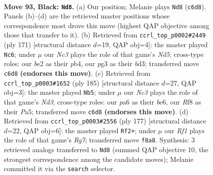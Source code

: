 \documentclass[11pt]{article}
\begin{document}
\clearpage

\begin{figure}[p]\centering
\begin{subfigure}{0.46\textwidth}\centering
\resizebox{\linewidth}{!}{%
\newchessgame
\chessboard[
  setfen={5r2/3k4/P1n5/8/8/4K1PP/2P1B3/1R6 b - - 20 93},
  showmover=false,
  pgfstyle=straightmove, color=movearrow, markmove={c6-d8}
]}
\caption{}
\end{subfigure}\hfill
\begin{subfigure}{0.46\textwidth}\centering
\resizebox{\linewidth}{!}{%
\newchessgame
\chessboard[
  setfen={8/8/8/3k4/PP1n4/3B3R/1K6/6r1 b - - 0 86},
  showmover=false,
  pgfstyle=straightmove, color=movearrow, markmove={d4-c6}
]}
\caption{}
\end{subfigure}
\\[4pt]
\begin{subfigure}{0.46\textwidth}\centering
\resizebox{\linewidth}{!}{%
\newchessgame
\chessboard[
  setfen={8/8/3nB3/p1k5/8/2PK4/P7/8 b - - 60 93},
  showmover=false,
  pgfstyle=straightmove, color=movearrow, markmove={d6-b5}
]}
\caption{}
\end{subfigure}\hfill
\begin{subfigure}{0.46\textwidth}\centering
\resizebox{\linewidth}{!}{%
\newchessgame
\chessboard[
  setfen={8/8/8/2n2B2/3k1K2/7P/6r1/4R3 b - - 8 89},
  showmover=false,
  pgfstyle=straightmove, color=movearrow, markmove={g2-f2}
]}
\caption{}
\end{subfigure}
\caption{\textbf{Move 93, Black: \texttt{Nd8}.} (a) Our position; Melanie plays \texttt{Nd8} (\texttt{c6d8}). Panels (b)--(d) are the retrieved master positions whose correspondence most drove this move (highest QAP objective among those that transfer to it). (b) Retrieved from \texttt{ccrl\_top\_p0002\#2449} (ply 171) [structural distance $d$=19, QAP obj=4]: the master played \texttt{Nc6}; under $\mu$ our \emph{Nc3} plays the role of that game's \emph{Nd5}; cross-type roles: our \emph{b}e2 as their \emph{p}b4, our \emph{p}g3 as their \emph{b}d3; transferred move \texttt{c6d8} \textbf{(endorses this move)}. (c) Retrieved from \texttt{ccrl\_top\_p0003\#1652} (ply 185) [structural distance $d$=27, QAP obj=3]: the master played \texttt{Nb5}; under $\mu$ our \emph{Nc3} plays the role of that game's \emph{Nd3}; cross-type roles: our \emph{p}a6 as their \emph{b}e6, our \emph{R}f8 as their \emph{P}a5; transferred move \texttt{c6d8} \textbf{(endorses this move)}. (d) Retrieved from \texttt{ccrl\_top\_p0003\#2556} (ply 177) [structural distance $d$=22, QAP obj=6]: the master played \texttt{Rf2+}; under $\mu$ our \emph{Rf1} plays the role of that game's \emph{Rg7}; transferred move \texttt{f8a8}. Synthesis: 3 retrieved analogs transferred to \texttt{Nd8} (summed QAP objective 10, the strongest correspondence among the candidate moves); Melanie committed it via the \texttt{search} selector.}
\label{fig:thought-m185}
\end{figure}
\end{document}
